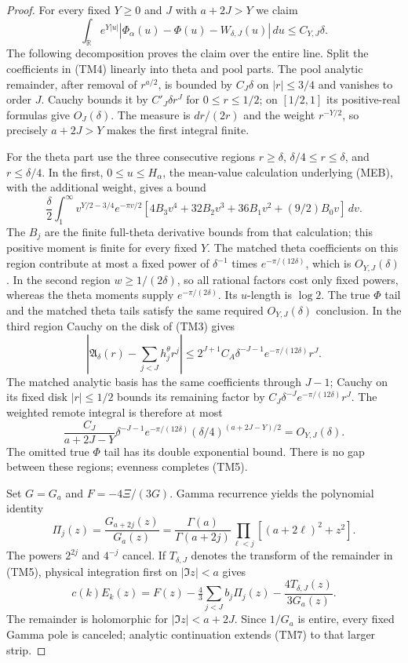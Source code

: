 \documentclass[11pt]{article}
\theoremstyle{remark}\newtheorem{remark}[theorem]{Remark}
\begin{document}
\begin{proof}
For every fixed $Y\ge0$ and $J$ with $a+2J>Y$ we claim
\[
 \int_{\mathbb R}e^{Y|u|}
       |\Phi_\alpha(u)-\Phi(u)-W_{\delta,J}(u)|\,du
                                      \le C_{Y,J}\delta. \tag{TM5}
\]
The following decomposition proves the claim over the entire line.
Split the coefficients in (TM4) linearly into theta and pool parts.
The pool analytic remainder, after removal of $r^{a/2}$,
is bounded by $C_J\delta$ on $|r|\le3/4$ and vanishes to order $J$.
Cauchy bounds it by $C'_J\delta r^J$ for $0\le r\le1/2$;
on $[1/2,1]$ its positive-real formulas give $O_J(\delta)$.
The measure is $dr/(2r)$ and the weight $r^{-Y/2}$,
so precisely $a+2J>Y$ makes the first integral finite.

For the theta part use the three consecutive regions
$r\ge\delta$, $\delta/4\le r\le\delta$, and $r\le\delta/4$.
In the first, $0\le u\le H_\alpha$, the mean-value calculation
underlying (MEB), with the additional weight, gives a bound
\[
 \frac{\delta}{2}\int_1^\infty
 v^{Y/2-3/4}e^{-\pi v/2}
 [4B_3v^4+32B_2v^3+36B_1v^2+(9/2)B_0v]\,dv .
\]
The $B_j$ are the finite full-theta derivative bounds from that
calculation; this positive moment is finite for every fixed $Y$.
The matched theta coefficients on this region contribute at most
a fixed power of $\delta^{-1}$ times $e^{-\pi/(12\delta)}$,
which is $O_{Y,J}(\delta)$.
In the second region $w\ge1/(2\delta)$, so all rational factors
cost only fixed powers, whereas the theta moments supply
$e^{-\pi/(2\delta)}$. Its $u$-length is $\log2$.
The true $\Phi$ tail and the matched theta tails satisfy the
same required $O_{Y,J}(\delta)$ conclusion.
In the third region Cauchy on the disk of (TM3) gives
\[
 \left|\mathfrak A_\delta(r)-\sum_{j<J}h_j^\theta r^j\right|
 \le2^{J+1}C_A\delta^{-J-1}e^{-\pi/(12\delta)}r^J.
\]
The matched analytic basis has the same coefficients through $J-1$;
Cauchy on its fixed disk $|r|\le1/2$ bounds its remaining factor
by $C_J\delta^{-J}e^{-\pi/(12\delta)}r^J$.
The weighted remote integral is therefore at most
\[
 \frac{C_J}{a+2J-Y}\delta^{-J-1}e^{-\pi/(12\delta)}
                       (\delta/4)^{(a+2J-Y)/2}
                  =O_{Y,J}(\delta).
\]
The omitted true $\Phi$ tail has its double exponential bound.
There is no gap between these regions; evenness completes (TM5).

Set $G=G_a$ and $F=-4\Xi/(3G)$.
Gamma recurrence yields the polynomial identity
\[
 \Pi_j(z)=\frac{G_{a+2j}(z)}{G_a(z)}
       =\frac{\Gamma(a)}{\Gamma(a+2j)}
                         \prod_{\ell<j}[(a+2\ell)^2+z^2]. \tag{TM6}
\]
The powers $2^{2j}$ and $4^{-j}$ cancel.
If $T_{\delta,J}$ denotes the transform of the remainder in (TM5),
physical integration first on $|\Im z|<a$ gives
\[
 c(k)E_k(z)=F(z)-\tfrac43\sum_{j<J}b_j\Pi_j(z)
                   -\frac{4T_{\delta,J}(z)}{3G_a(z)}.     \tag{TM7}
\]
The remainder is holomorphic for $|\Im z|<a+2J$.
Since $1/G_a$ is entire, every fixed Gamma pole is canceled;
analytic continuation extends (TM7) to that larger strip.


\end{proof}
\end{document}
